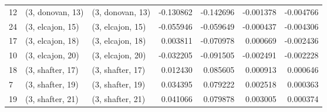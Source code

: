 \begin{tabular}{lllrrrr}
12 &  (3, donovan, 13) &  (3, donovan, 13) & -0.130862 & -0.142696 &  -0.001378 & -0.004766 \\
24 &  (3, elcajon, 15) &  (3, elcajon, 15) & -0.055946 & -0.059649 &  -0.000437 & -0.004306 \\
17 &  (3, elcajon, 18) &  (3, elcajon, 18) &  0.003811 & -0.070978 &   0.000669 & -0.002436 \\
10 &  (3, elcajon, 20) &  (3, elcajon, 20) & -0.032205 & -0.091505 &  -0.002491 & -0.002228 \\
18 &  (3, shafter, 17) &  (3, shafter, 17) &  0.012430 &  0.085605 &   0.000913 &  0.000646 \\
7  &  (3, shafter, 19) &  (3, shafter, 19) &  0.034395 &  0.079222 &   0.002518 &  0.000363 \\
19 &  (3, shafter, 21) &  (3, shafter, 21) &  0.041066 &  0.079878 &   0.003005 &  0.000374 \\
\bottomrule
\end{tabular}
